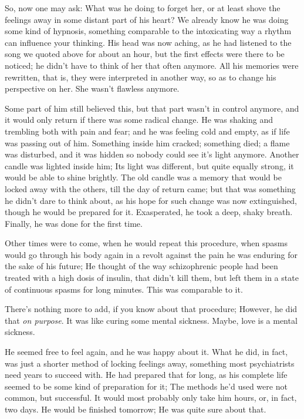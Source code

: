 So, now one may ask: What was he doing to forget her, or at least shove the feelings away in some distant part of his heart?
We already know he was doing some kind of hypnosis, something comparable to the intoxicating way a rhythm can influence your thinking. 
His head was now aching, as he had listened to the song we quoted above for about an hour, but the first effects were there to be noticed; he didn't have to think of her that often anymore. 
All his memories were rewritten, that is, they were interpreted in another way, so as to change his perspective on her. 
She wasn't flawless anymore.

Some part of him still believed this, but that part wasn't in control anymore, and it would only return if there was some radical change. 
He was shaking and trembling both with pain and fear; and he was feeling cold and empty, as if life was passing out of him. 
Something inside him cracked; something died; a flame was disturbed, and it was hidden so nobody could see it's light anymore. 
Another candle was lighted inside him; Its light was different, but quite equally strong, it would be able to shine brightly. The old candle was a memory that would be locked away with the others, till the day of return came; but that was something he didn't dare to think about, as his hope for such change was now extinguished, though he would be prepared for it. 
Exasperated, he took a deep, shaky breath. 
Finally, he was done for the first time.

Other times were to come, when he would repeat this procedure, when spasms would go through his body again in a revolt against the pain he was enduring for the sake of his future; He thought of the way schizophrenic people had been treated with a high dosis of insulin, that didn't kill them, but left them in a state of continuous spasms for long minutes. 
This was comparable to it.

There's nothing more to add, if you know about that procedure; However, he did that \emph{on purpose}. 
It was like curing some mental sickness. 
Maybe, love is a mental sickness.

He seemed free to feel again, and he was happy about it. 
What he did, in fact, was just a shorter method of locking feelings away, something most psychiatrists need years to succeed with. 
He had prepared that for long, as his complete life seemed to be some kind of preparation for it; The methods he'd used were not common, but successful. 
It would most probably only take him hours, or, in fact, two days. 
He would be finished tomorrow; He was quite sure about that.

